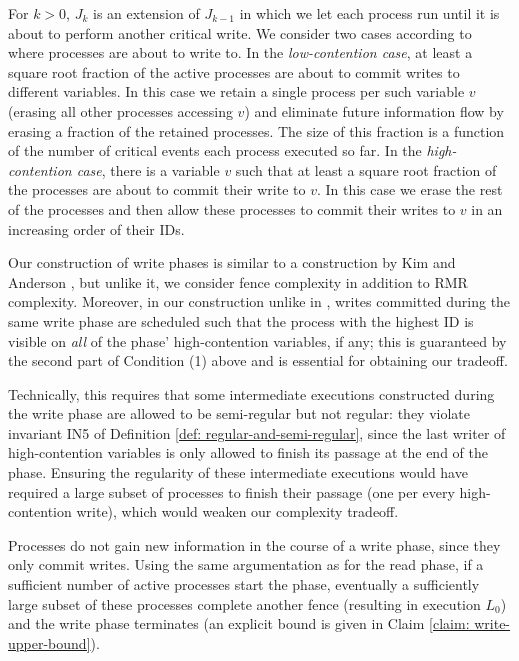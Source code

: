 For $k>0$, $J_k$ is an extension of $J_{k-1}$ in which we let each process run until it is about to perform another critical write. We consider two cases according to where processes are about to write to. In the \emph{low-contention case}, at least a square root fraction of the active processes are about to commit writes to different variables. In this case we retain a single process per such variable $v$ (erasing all other processes accessing $v$) and eliminate future information flow by erasing a fraction of the retained processes. The size of this fraction is a function of the number of critical events each process executed so far. In the \emph{high-contention case}, there is a variable $v$ such that at least a square root fraction of the processes are about to commit their write to $v$. In this case we erase the rest of the processes and then allow these processes to commit their writes to $v$ in an increasing order of their IDs.

Our construction of write phases is similar to a construction by Kim and Anderson \cite{DBLP:journals/dc/KimA12}, but unlike it, we consider fence complexity in addition to RMR complexity. Moreover, in our construction unlike in \cite{DBLP:journals/dc/KimA12}, writes committed during the same write phase are scheduled such that the process with the highest ID is visible on \textit{all} of the phase' high-contention variables, if any; this is guaranteed by the second part of Condition (1) above and is essential for obtaining our tradeoff.

Technically, this requires that some intermediate executions constructed during the write phase are allowed to be semi-regular but not regular: they violate invariant IN5 of Definition \ref{def: regular-and-semi-regular}, since the last writer of high-contention variables is only allowed to finish its passage at the end of the phase. Ensuring the regularity of these intermediate executions would have required a large subset of processes to finish their passage (one per every high-contention write), which would weaken our complexity tradeoff.

Processes do not gain new information in the course of a write phase, since they only commit writes. Using the same argumentation as for the read phase, if a sufficient number of active processes start the phase, eventually a sufficiently large subset of these processes complete another fence (resulting in execution $L_0$) and the write phase terminates (an explicit bound is given in Claim
\ref{claim: write-upper-bound}).




